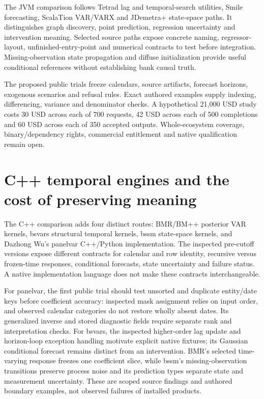 The JVM comparison follows Tetrad lag and temporal-search utilities,
Smile forecasting, ScalaTion VAR/VARX and JDemetra+ state-space paths.
It distinguishes graph discovery, point prediction, regression
uncertainty and intervention meaning. Selected source paths expose
concrete naming, regressor-layout, unfinished-entry-point and numerical
contracts to test before integration. Missing-observation state
propagation and diffuse initialization provide useful conditional
references without establishing bank causal truth.
\citep{exec25_jdyn_tetrad,exec25_jdyn_smile,exec25_jdyn_scalation,exec25_jdyn_jdplus}

The proposed public trials freeze calendars, source artifacts, forecast
horizons, exogenous scenarios and refusal rules. Exact authored examples
supply indexing, differencing, variance and denominator checks. A
hypothetical 21,000 USD study costs 30 USD across each of 700 requests,
42 USD across each of 500 completions and 60 USD across each of 350
accepted outputs. Whole-ecosystem coverage, binary/dependency rights,
commercial entitlement and native qualification remain open.
\citep{exec25_jdyn_choice}

\hypertarget{c-temporal-engines-and-the-cost-of-preserving-meaning}{%
\section{C++ temporal engines and the cost of preserving
meaning}\label{c-temporal-engines-and-the-cost-of-preserving-meaning}}

The C++ comparison adds four distinct routes: BMR/BM++ posterior VAR
kernels, bsvars structural temporal kernels, bssm state-space kernels,
and Dazhong Wu's panelvar C++/Python implementation. The inspected
pre-cutoff versions expose different contracts for calendar and row
identity, recursive versus frozen-time responses, conditional forecasts,
state uncertainty and failure status. A native implementation language
does not make these contracts interchangeable.
\citep{exec25_cdyn_bmr,exec25_cdyn_bsvars,exec25_cdyn_bssm,exec25_cdyn_panelvar}

For panelvar, the first public trial should test unsorted and duplicate
entity/date keys before coefficient accuracy: inspected mask assignment
relies on input order, and observed calendar categories do not restore
wholly absent dates. Its generalized inverse and stored diagnostic
fields require separate rank and interpretation checks. For bsvars, the
inspected higher-order lag update and horizon-loop exception handling
motivate explicit native fixtures; its Gaussian conditional forecast
remains distinct from an intervention. BMR's selected time-varying
response freezes one coefficient slice, while bssm's missing-observation
transitions preserve process noise and its prediction types separate
state and measurement uncertainty. These are scoped source findings and
authored boundary examples, not observed failures of installed products.
\citep{exec25_cdyn_panelvar,exec25_cdyn_bsvars,exec25_cdyn_bmr,exec25_cdyn_bssm}

